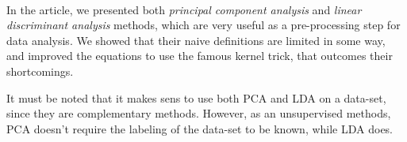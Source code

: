 \paragraph{}
In the article, we presented both \emph{principal component analysis} and \emph{linear discriminant analysis} methods, which are very useful as a pre-processing step for data analysis. We showed that their naive definitions are limited in some way, and improved the equations to use the famous kernel trick, that outcomes their shortcomings.

It must be noted that it makes sens to use both PCA and LDA on a data-set, since they are complementary methods. However, as an unsupervised methods, PCA doesn't require the labeling of the data-set to be known, while LDA does.